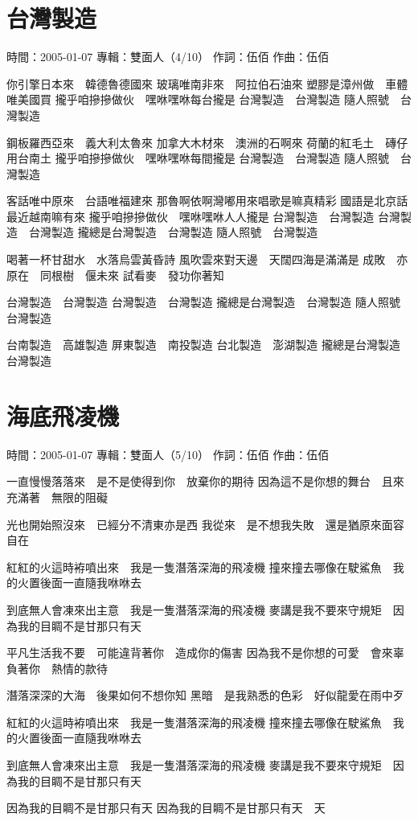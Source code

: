 \documentclass[UTF8,a4paper,oneside,twocolumn,12pt]{ctexbook}
\newcommand{\infopair}[2]{\textbullet #1：#2}
\newcommand{\zc}[1][伍佰]{\infopair{作詞}{#1}}
\newcommand{\zq}[1][伍佰]{\infopair{作曲}{#1}}
\newcommand{\zj}[1]{\infopair{專輯}{#1}}
\newcommand{\sj}[1]{\infopair{時間}{#1}}
\newenvironment{info}{\begin{flushleft}\kaishu
	}
	{\end{flushleft}\normalsize\yahei\par}
\newenvironment{lyric}{
	}
{}
\begin{document}
\section{台灣製造}
\begin{info}
	\sj{2005-01-07}
	\zj{雙面人（4/10）}
	\zc
	\zq
\end{info}
\begin{lyric}
	你引擎日本來　韓德魯德國來
	玻璃唯南非來　阿拉伯石油來
	塑膠是漳州做　車體唯美國買
	攏乎咱摻摻做伙　嘿咻嘿咻每台攏是
	台灣製造　台灣製造
	隨人照號　台灣製造

	鋼板羅西亞來　義大利太魯來
	加拿大木材來　澳洲的石啊來
	荷蘭的紅毛土　磚仔用台南土
	攏乎咱摻摻做伙　嘿咻嘿咻每間攏是
	台灣製造　台灣製造
	隨人照號　台灣製造

	客話唯中原來　台語唯福建來
	那魯啊依啊灣嘟用來唱歌是嘛真精彩
	國語是北京話　最近越南嘛有來
	攏乎咱摻摻做伙　嘿咻嘿咻人人攏是
	台灣製造　台灣製造
	台灣製造　台灣製造
	攏總是台灣製造　台灣製造
	隨人照號　台灣製造

	喝著一杯甘甜水　水落烏雲黃昏詩
	風吹雲來對天邊　天闊四海是滿滿是
	成敗　亦原在　同根樹　偃未來
	試看麥　發功你著知

	台灣製造　台灣製造
	台灣製造　台灣製造
	攏總是台灣製造　台灣製造
	隨人照號　台灣製造

	台南製造　高雄製造
	屏東製造　南投製造
	台北製造　澎湖製造
	攏總是台灣製造　台灣製造
\end{lyric}

\section{海底飛凌機}
\begin{info}
	\sj{2005-01-07}
	\zj{雙面人（5/10）}
	\zc
	\zq
\end{info}
\begin{lyric}
	一直慢慢落落來　是不是使得到你　放棄你的期待
	因為這不是你想的舞台　且來充滿著　無限的阻礙

	光也開始照沒來　已經分不清東亦是西
	我從來　是不想我失敗　還是猶原來面容自在

	紅紅的火這時袸噴出來　我是一隻潛落深海的飛凌機
	撞來撞去哪像在駛鯊魚　我的火置後面一直隨我咻咻去

	到底無人會凍來出主意　我是一隻潛落深海的飛凌機
	麥講是我不要來守規矩　因為我的目睭不是甘那只有天

	平凡生活我不要　可能違背著你　造成你的傷害
	因為我不是你想的可愛　會來辜負著你　熱情的款待

	潛落深深的大海　後果如何不想你知
	黑暗　是我熟悉的色彩　好似龍愛在雨中歹

	紅紅的火這時袸噴出來　我是一隻潛落深海的飛凌機
	撞來撞去哪像在駛鯊魚　我的火置後面一直隨我咻咻去

	到底無人會凍來出主意　我是一隻潛落深海的飛凌機
	麥講是我不要來守規矩　因為我的目睭不是甘那只有天

	因為我的目睭不是甘那只有天
	因為我的目睭不是甘那只有天　天
\end{lyric}
\end{document}
